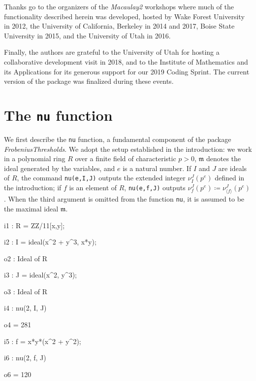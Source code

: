 \documentclass{amsart}
\newcommand{\idealm}{\mathfrak{m}}
\begin{document}
Thanks go to the organizers of the \emph{Macaulay2} workshops where much of the functionality described herein was developed, hosted by Wake Forest University in 2012, the University of California, Berkeley in 2014 and 2017, Boise State University in 2015, and the University of Utah in 2016.

Finally, the authors are grateful to the University of Utah for hosting a collaborative development visit in 2018, and to the Institute of Mathematics and its Applications for its generous support for our 2019 Coding Sprint.
The current version of the package was finalized during these events.

\section{The {\tt nu} function}
\label{sec.Nu}

We first describe the \texttt{nu} function, a fundamental component of the package \emph{FrobeniusThresholds}.
We adopt the setup established in the introduction: we work in a polynomial ring $R$ over a finite field of characteristic $p>0$,  $\idealm$ denotes the ideal generated by the variables, and $e$ is a natural number.
If $I$ and $J$ are ideals of $R$, the command \texttt{nu(e,I,J)} outputs the extended integer $\nu_I^J(p^e)$ defined in the introduction; if $f$ is an element of $R$, \texttt{nu(e,f,J)} outputs $\nu_f^J(p^e) \coloneqq \nu_{\langle f \rangle}^J(p^e)$.
When the third argument is omitted from the function \texttt{nu}, it is assumed to be the maximal ideal $\idealm$.

\smallskip
{\small
{}
\begin{MyVerbatim}
i1 : R = ZZ/11[x,y];

i2 : I = ideal(x^2 + y^3, x*y);

o2 : Ideal of R

i3 : J = ideal(x^2, y^3);

o3 : Ideal of R

i4 : nu(2, I, J)

o4 = 281

i5 : f = x*y*(x^2 + y^2);

i6 : nu(2, f, J)

o6 = 120
\end{MyVerbatim}
}
\end{document}
